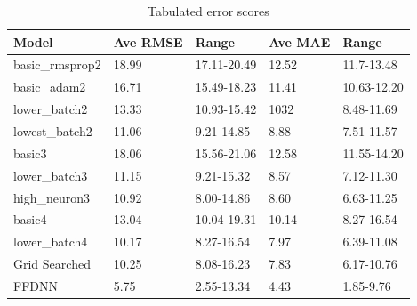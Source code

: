 \documentclass[10pt,11pt,12pt,oneside]{book}
\begin{document}
\begin{table}[H]
\centering
\begin{tabular}{|l|l|l|l|l|}
\toprule
Model & Ave RMSE & Range & Ave MAE & Range \\
\hline
basic\_rmsprop2  & 18.99 & 17.11-20.49 & 12.52 & 11.7-13.48 \\
\hline
basic\_adam2  & 16.71 & 15.49-18.23 & 11.41 & 10.63-12.20 \\
\hline
lower\_batch2 & 13.33 & 10.93-15.42 & 1032 & 8.48-11.69  \\
\hline
lowest\_batch2 & 11.06 & 9.21-14.85 & 8.88 & 7.51-11.57 \\
\hline
basic3 & 18.06 & 15.56-21.06 & 12.58 & 11.55-14.20 \\
\hline
lower\_batch3 & 11.15 & 9.21-15.32 & 8.57 & 7.12-11.30 \\
\hline
high\_neuron3 & 10.92 & 8.00-14.86 & 8.60 & 6.63-11.25 \\
\hline
basic4 & 13.04 & 10.04-19.31 & 10.14 & 8.27-16.54 \\
\hline
lower\_batch4 & 10.17 & 8.27-16.54 & 7.97 & 6.39-11.08 \\
\hline
Grid Searched & 10.25 & 8.08-16.23 & 7.83 & 6.17-10.76 \\
\hline
FFDNN & 5.75 & 2.55-13.34 & 4.43 & 1.85-9.76 \\
\bottomrule
\end{tabular}
\caption{Tabulated error scores}
\label{table:results}
\end{table}
\end{document}
